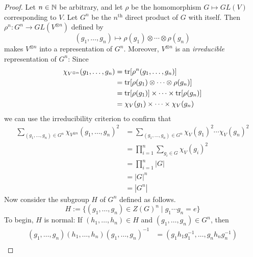 \documentclass[../psets.tex]{subfiles}
\begin{document}
\begin{enumerate}
\begin{proof}


        Let $n\in\mathbb{N}$ be arbitrary, and let $\rho$ be the homomorphism $G\mapsto GL(V)$ corresponding to $V$. Let $G^n$ be the $n^\text{th}$ direct product of $G$ with itself. Then $\rho^n:G^n\to GL(V^{\otimes n})$ defined by
        \begin{equation*}
            (g_1,\dots,g_n) \mapsto \rho(g_1)\otimes\cdots\otimes\rho(g_n)
        \end{equation*}
        makes $V^{\otimes n}$ into a representation of $G^n$. Moreover, $V^{\otimes n}$ is an \emph{irreducible} representation of $G^n$: Since
        \begin{align*}
            \chi_{V^{\otimes n}}(g_1,\dots,g_n) &= \tr[\rho^n(g_1,\dots,g_n)]\\
            &= \tr[\rho(g_1)\otimes\cdots\otimes\rho(g_n)]\\
            &= \tr[\rho(g_1)]\times\cdots\times\tr[\rho(g_n)]\\
            &= \chi_V(g_1)\times\cdots\times\chi_V(g_n)
        \end{align*}
        we can use the irreducibility criterion to confirm that
        \begin{align*}
            \sum_{(g_1,\dots,g_n)\in G^n}\chi_{V^{\otimes n}}(g_1,\dots,g_n)^2 &= \sum_{(g_1,\dots,g_n)\in G^n}\chi_V(g_1)^2\cdots\chi_V(g_n)^2\\
            &= \prod_{i=1}^n\sum_{g_i\in G}\chi_V(g_i)^2\\
            &= \prod_{i=1}^n|G|\\
            &= |G|^n\\
            &= |G^n|
        \end{align*}
        Now consider the subgroup $H$ of $G^n$ defined as follows.
        \begin{equation*}
            H := \{(g_1,\dots,g_n)\in Z(G)^n\mid g_1\cdots g_n=e\}
        \end{equation*}
        To begin, $H$ is normal: If $(h_1,\dots,h_n)\in H$ and $(g_1,\dots,g_n)\in G^n$, then
        \begin{align*}
            (g_1,\dots,g_n)(h_1,\dots,h_n)(g_1,\dots,g_n)^{-1} &= (g_1h_1g_1^{-1},\dots,g_nh_ng_n^{-1})\\

\end{align*}
\end{proof}
\end{enumerate}
\end{document}
